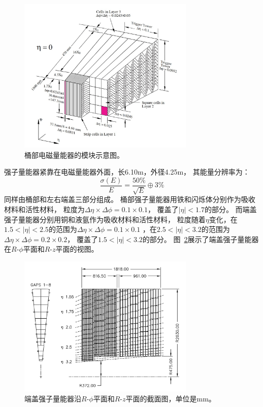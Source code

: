 \begin{figure}
  \begin{center}
    \includegraphics[width=0.75\textwidth]{figuresEXP/ATLASCA3.jpg}
  \end{center}
  \caption{
桶部电磁量能器的模块示意图。
  }
    \label{fig:ATLASCA3}
\end{figure}

强子量能器紧靠在电磁量能器外面，长6.10m，外径4.25m，
其能量分辨率为：
\begin{equation} 
\label{eq:EMsigma2}
\frac{\sigma(E)}{E}=\frac{50\%}{\sqrt{E}}\oplus 3\%
\end{equation}
同样由桶部和左右端盖三部分组成。
桶部强子量能器用铁和闪烁体分别作为吸收材料和活性材料，
粒度为$\Delta\eta\times\Delta\phi=0.1\times0.1$，
覆盖了$|\eta|<1.7$的部分。
而端盖强子量能器分别用铜和液氩作为吸收材料和活性材料，
粒度随着$\eta$变化，在$1.5<|\eta|<2.5$的范围为$\Delta\eta\times\Delta\phi=0.1\times0.1$
，在$2.5<|\eta|<3.2$的范围为$\Delta\eta\times\Delta\phi=0.2\times0.2$，
覆盖了$1.5<|\eta|<3.2$的部分。
图~\ref{fig:ATLASCA4}展示了端盖强子量能器在$R$-$\phi$平面和$R$-$z$平面的视图。

\begin{figure}
  \begin{center}
    \includegraphics[width=0.75\textwidth]{figuresEXP/ATLASCA4.jpg}
  \end{center}
  \caption{
端盖强子量能器沿$R$-$\phi$平面和$R$-$z$平面的截面图，单位是mm。
  }
    \label{fig:ATLASCA4}
\end{figure}

